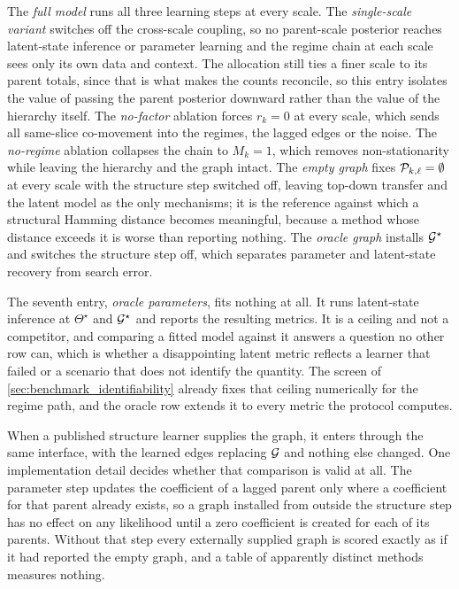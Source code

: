 The \emph{full model} runs all three learning steps at every scale. The
\emph{single-scale variant} switches off the cross-scale coupling, so no
parent-scale posterior reaches latent-state inference or parameter learning and
the regime chain at each scale sees only its own data and context. The
allocation still ties a finer scale to its parent totals, since that is what
makes the counts reconcile, so this entry isolates the value of passing the
parent posterior downward rather than the value of the hierarchy itself. The
\emph{no-factor} ablation forces \(r_k = 0\) at every scale, which sends all
same-slice co-movement into the regimes, the lagged edges or the noise. The
\emph{no-regime} ablation collapses the chain to \(M_k = 1\), which removes
non-stationarity while leaving the hierarchy and the graph intact. The
\emph{empty graph} fixes \({\mathcal{P}}_{k,\ell} = \emptyset\) at every scale with the
structure step switched off, leaving top-down transfer and the latent model as
the only mechanisms; it is the reference against which a structural Hamming
distance becomes meaningful, because a method whose distance exceeds it is
worse than reporting nothing. The \emph{oracle graph} installs
\({\mathcal{G}}^\star\) and switches the structure step off, which separates parameter
and latent-state recovery from search error.

The seventh entry, \emph{oracle parameters}, fits nothing at all. It runs
latent-state inference at \(\Theta^\star\) and \({\mathcal{G}}^\star\) and reports the
resulting metrics. It is a ceiling and not a competitor, and comparing a fitted
model against it answers a question no other row can, which is whether a
disappointing latent metric reflects a learner that failed or a scenario that
does not identify the quantity. The screen of
\cref{sec:benchmark_identifiability} already fixes that ceiling numerically for
the regime path, and the oracle row extends it to every metric the protocol
computes.

When a published structure learner supplies the graph, it enters through the
same interface, with the learned edges replacing \({\mathcal{G}}\) and nothing else
changed. One implementation detail decides whether that comparison is valid at
all. The parameter step updates the coefficient of a lagged parent only where a
coefficient for that parent already exists, so a graph installed from outside
the structure step has no effect on any likelihood until a zero coefficient is
created for each of its parents. Without that step every externally supplied
graph is scored exactly as if it had reported the empty graph, and a table of
apparently distinct methods measures nothing.


